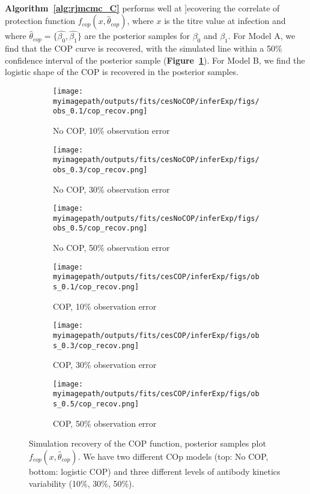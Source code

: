 \paragraph{} \textbf{Algorithm~\ref{alg:rjmcmc_C}} performs well at ]ecovering the correlate of protection function $f_{cop}(x, \hat{\theta}_{cop})$, where $x$ is the titre value at infection and where $\hat{\theta}_{cop} = \{\hat{\beta_0}, \hat{\beta_1}\}$ are the posterior samples for $\beta_0$ and $\beta_1$. For Model A, we find that the COP curve is recovered, with the simulated line within a 50\% confidence interval of the posterior sample (\textbf{Figure~\ref{fit2:cop}}). For Model B, we find the logistic shape of the COP is recovered in the posterior samples. 

\begin{figure}[H]

    \centering
    \begin{subfigure}{0.31\textwidth}
        \centering
        \texttt{[image: \\myimagepath/outputs/fits/cesNoCOP/inferExp/figs/obs\_0.1/cop\_recov.png]}
        \caption{No COP, 10\% observation error}
    \end{subfigure}
    \begin{subfigure}{0.31\textwidth}
        \centering
        \texttt{[image: \\myimagepath/outputs/fits/cesNoCOP/inferExp/figs/obs\_0.3/cop\_recov.png]}
        \caption{No COP, 30\% observation error}
    \end{subfigure}
    \begin{subfigure}{0.31\textwidth}
        \centering
        \texttt{[image: \\myimagepath/outputs/fits/cesNoCOP/inferExp/figs/obs\_0.5/cop\_recov.png]}
        \caption{No COP, 50\% observation error}
    \end{subfigure}
    
  \begin{subfigure}{0.31\textwidth}
        \centering
        \texttt{[image: \\myimagepath/outputs/fits/cesCOP/inferExp/figs/obs\_0.1/cop\_recov.png]}
        \caption{ COP, 10\% observation error}
    \end{subfigure}
    \begin{subfigure}{0.31\textwidth}
        \centering
        \texttt{[image: \\myimagepath/outputs/fits/cesCOP/inferExp/figs/obs\_0.3/cop\_recov.png]}
        \caption{ COP, 30\% observation error}
    \end{subfigure}
    \begin{subfigure}{0.31\textwidth}
        \centering
        \texttt{[image: \\myimagepath/outputs/fits/cesCOP/inferExp/figs/obs\_0.5/cop\_recov.png]}
        \caption{ COP, 50\% observation error}
    \end{subfigure}
    
    \caption{Simulation recovery of the COP function, posterior samples plot  $f_{cop}(x, \hat{\theta}_{cop})$. We have two different COp models (top: No COP, bottom: logistic COP) and three different levels of antibody kinetics variability (10\%, 30\%, 50\%). \label{fit2:cop}}
\end{figure}




